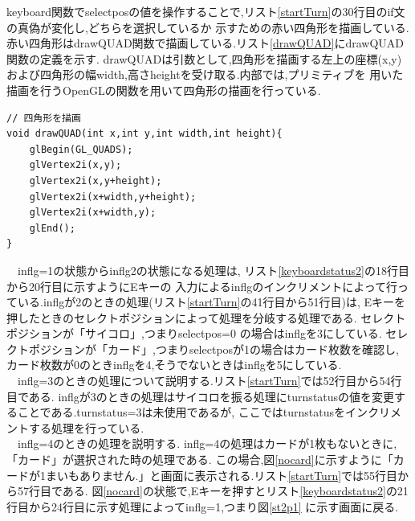 \documentclass[a4j]{jarticle}
\begin{document}
        keyboard関数でselectposの値を操作することで,リスト\ref{startTurn}の30行目のif文の真偽が変化し,どちらを選択しているか
        示すための赤い四角形を描画している.赤い四角形はdrawQUAD関数で描画している.リスト\ref{drawQUAD}にdrawQUAD関数の定義を示す.
        drawQUADは引数として,四角形を描画する左上の座標(x,y)および四角形の幅width,高さheightを受け取る.内部では,プリミティブを
        用いた描画を行うOpenGLの関数を用いて四角形の描画を行っている.

        \begin{lstlisting}[basicstyle=\ttfamily\footnotesize, frame=single,label=drawQUAD,caption=drawQUAD関数]
// 四角形を描画
void drawQUAD(int x,int y,int width,int height){
    glBegin(GL_QUADS);
    glVertex2i(x,y);
    glVertex2i(x,y+height);
    glVertex2i(x+width,y+height);
    glVertex2i(x+width,y);
    glEnd();       
}
        \end{lstlisting}   
        　inflg=1の状態からinflg2の状態になる処理は, リスト\ref{keyboardstatus2}の18行目から20行目に示すようにEキーの
        入力によるinflgのインクリメントによって行っている.inflgが2のときの処理(リスト\ref{startTurn}の41行目から51行目)は,
        Eキーを押したときのセレクトポジションによって処理を分岐する処理である. セレクトポジションが「サイコロ」,つまりselectpos=0
        の場合はinflgを3にしている. セレクトポジションが「カード」,つまりselectposが1の場合はカード枚数を確認し,
        カード枚数が0のときinflgを4,そうでないときはinflgを5にしている.\\
        　inflg=3のときの処理について説明する.リスト\ref{startTurn}では52行目から54行目である.
        inflgが3のときの処理はサイコロを振る処理にturnstatusの値を変更することである.turnstatus=3は未使用であるが,
        ここではturnstatusをインクリメントする処理を行っている.\\
        　inflg=4のときの処理を説明する. inflg=4の処理はカードが1枚もないときに,「カード」が選択された時の処理である.
        この場合,図\ref{nocard}に示すように「カードが1まいもありません.」と画面に表示される.リスト\ref{startTurn}では55行目から57行目である. 
        図\ref{nocard}の状態で,Eキーを押すとリスト\ref{keyboardstatus2}の21行目から24行目に示す処理によってinflg=1,つまり図\ref{st2p1}
        に示す画面に戻る.
\end{document}

